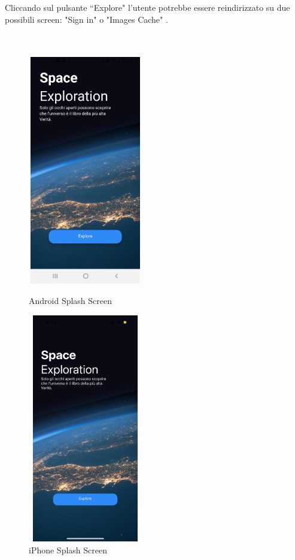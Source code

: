 Cliccando sul pulsante ``Explore" l'utente potrebbe essere reindirizzato su due possibili screen: "Sign in" o "Images Cache" .\\ \\ \\
\begin{figure}[h]
    \begin{minipage}[h]{0.47\textwidth}
        \centering
        \includegraphics[width=5cm, height=10cm]{images/immaginiAndroid/splashScreen.jpg}
        \caption{\label{SpalshScreenAndroid} Android Splash Screen}
    \end{minipage}
    \hfill
    \begin{minipage}[h]{0.47\textwidth}
        \centering
        \includegraphics[width=5cm, height=10cm]{images/immaginiPhone/splashScreen.jpeg}
        \caption{\label{splashScreenIphone}iPhone Splash Screen}
    \end{minipage}
\end{figure}


